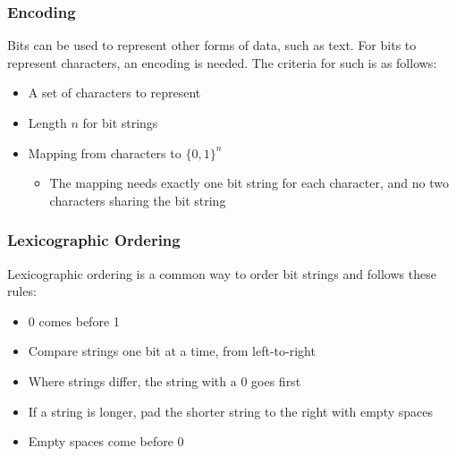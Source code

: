 \documentclass{article}
\begin{document}
\subsubsection{Encoding}
Bits can be used to represent other forms of data, such as text.
For bits to represent characters, an encoding is needed.
The criteria for such is as follows:
\begin{itemize}
    \item A set of characters to represent
    \item Length \(n\) for bit strings
    \item Mapping from characters to \(\lbrace 0,1 \rbrace ^n\)
    \begin{itemize}
        \item The mapping needs exactly one bit string for each character,
              and no two characters sharing the bit string
    \end{itemize}
\end{itemize}
%
\subsubsection{Lexicographic Ordering}
Lexicographic ordering is a common way to order bit strings and follows these rules:
\begin{itemize}
    \item 0 comes before 1
    \item Compare strings one bit at a time, from left-to-right
    \item Where strings differ, the string with a 0 goes first
    \item If a string is longer, pad the shorter string to the right with empty spaces
    \item Empty spaces come before 0
\end{itemize}
%
\newpage
\end{document}
